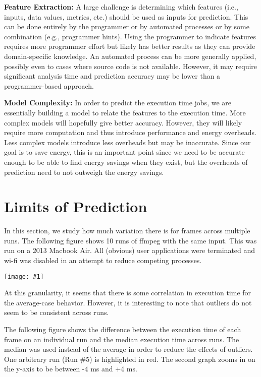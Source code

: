 \documentclass[11pt, letterpaper]{article}
\providecommand{\figcol}[1]{
    \noindent
    \begin{center}
      \texttt{[image: \#1]}
    \end{center}
  }
\begin{document}
\noindent\textbf{Feature Extraction: } A large challenge is determining which features
(i.e., inputs, data values, metrics, etc.) should be used as inputs for
prediction. This can be done entirely by the programmer or by automated
processes or by some combination (e.g., programmer hints). Using the programmer
to indicate features requires more programmer effort but likely has better
results as they can provide domain-specific knowledge. An automated process can
be more generally applied, possibly even to cases where source code is not
available. However, it may require significant analysis time and prediction
accuracy may be lower than a programmer-based approach.

\noindent\textbf{Model Complexity: } In order to predict the execution time jobs, we are
essentially building a model to relate the features to the execution time. More
complex models will hopefully give better accuracy. However, they will likely
require more computation and thus introduce performance and energy overheads.
Less complex models introduce less overheads but may be inaccurate. Since our
goal is to save energy, this is an important point since we need to be accurate
enough to be able to find energy savings when they exist, but the overheads of
prediction need to not outweigh the energy savings.

\section{Limits of Prediction}
\label{sec:limit}

In this section, we study how much variation there is for frames across
multiple runs. The following figure shows 10 runs of ffmpeg with the same
input. This was run on a 2013 Macbook Air. All (obvious) user applications were
terminated and wi-fi was disabled in an attempt to reduce competing processes.

\figcol{figs/frames_overlay.png}

At this granularity, it seems that there is some correlation in execution time
for the average-case behavior. However, it is interesting to note that outliers
do not seem to be consistent across runs.

The following figure shows the difference between the execution time of each
frame on an individual run and the median execution time across runs. The
median was used instead of the average in order to reduce the effects of
outliers. One arbitrary run (Run \#5) is highlighted in red. The second graph
zooms in on the y-axis to be between -4 ms and +4 ms.
\end{document}
